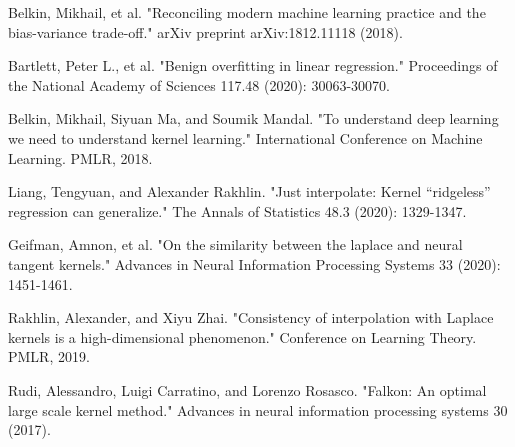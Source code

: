 \documentclass[12pt]{amsart}
\begin{document}
\begin{thebibliography}{20}

Belkin, Mikhail, et al. "Reconciling modern machine learning practice and the bias-variance trade-off." arXiv preprint arXiv:1812.11118 (2018).

Bartlett, Peter L., et al. "Benign overfitting in linear regression." Proceedings of the National Academy of Sciences 117.48 (2020): 30063-30070.

Belkin, Mikhail, Siyuan Ma, and Soumik Mandal. "To understand deep learning we need to understand kernel learning." International Conference on Machine Learning. PMLR, 2018.

Liang, Tengyuan, and Alexander Rakhlin. "Just interpolate: Kernel “ridgeless” regression can generalize." The Annals of Statistics 48.3 (2020): 1329-1347.

Geifman, Amnon, et al. "On the similarity between the laplace and neural tangent kernels." Advances in Neural Information Processing Systems 33 (2020): 1451-1461.

Rakhlin, Alexander, and Xiyu Zhai. "Consistency of interpolation with Laplace kernels is a high-dimensional phenomenon." Conference on Learning Theory. PMLR, 2019.

Rudi, Alessandro, Luigi Carratino, and Lorenzo Rosasco. "Falkon: An optimal large scale kernel method." Advances in neural information processing systems 30 (2017).

\end{thebibliography}
\end{document}
